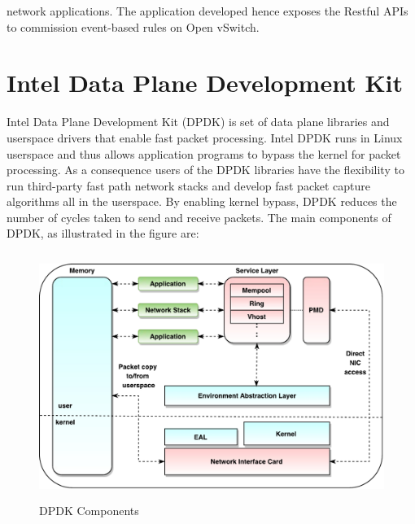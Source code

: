 network applications. The application developed hence exposes the Restful APIs to commission event-based rules on Open vSwitch.


\section{Intel Data Plane Development Kit}
Intel Data Plane Development Kit (DPDK) \cite{DPDK} is set of data plane libraries and userspace drivers that enable fast packet processing. Intel DPDK runs in Linux userspace and thus allows application programs to bypass the kernel for packet processing. As a consequence users of the DPDK libraries have the flexibility to run third-party fast path network stacks and develop fast packet capture algorithms all in the userspace. By enabling kernel bypass, DPDK reduces the number of cycles taken to send and receive packets. The main components of DPDK, as illustrated in the figure  are:

 \begin{figure}[H]
 \centering
 \caption{DPDK Components}
 \includegraphics[height=8cm]{DPDK03.pdf}
\end{figure}

